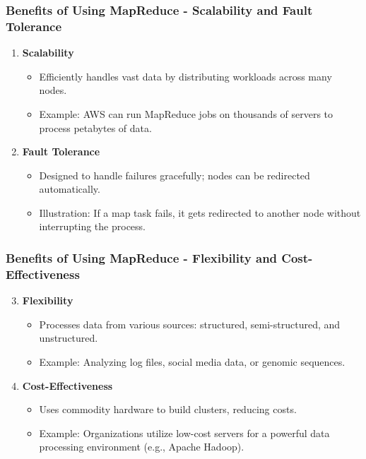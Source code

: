 \documentclass[aspectratio=169]{beamer}
\begin{document}
\begin{frame}[fragile]
  \frametitle{Benefits of Using MapReduce - Scalability and Fault Tolerance}
  \begin{enumerate}
    \item \textbf{Scalability}
    \begin{itemize}
      \item Efficiently handles vast data by distributing workloads across many nodes.
      \item Example: AWS can run MapReduce jobs on thousands of servers to process petabytes of data.
    \end{itemize}
  
    \item \textbf{Fault Tolerance}
    \begin{itemize}
      \item Designed to handle failures gracefully; nodes can be redirected automatically.
      \item Illustration: If a map task fails, it gets redirected to another node without interrupting the process.
    \end{itemize}
  \end{enumerate}
\end{frame}

\begin{frame}[fragile]
  \frametitle{Benefits of Using MapReduce - Flexibility and Cost-Effectiveness}
  \begin{enumerate}
    \setcounter{enumi}{2} %
    \item \textbf{Flexibility}
    \begin{itemize}
      \item Processes data from various sources: structured, semi-structured, and unstructured.
      \item Example: Analyzing log files, social media data, or genomic sequences.
    \end{itemize}

    \item \textbf{Cost-Effectiveness}
    \begin{itemize}
      \item Uses commodity hardware to build clusters, reducing costs.
      \item Example: Organizations utilize low-cost servers for a powerful data processing environment (e.g., Apache Hadoop).
    \end{itemize}
  \end{enumerate}
\end{frame}
\end{document}
